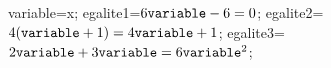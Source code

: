 \documentclass[exercice]{thedocument}%
\begin{document}
%
    \>variable=x;%
    \>egalite1={$6\<variable;-6=0$};%
    \>egalite2={$4(\<variable;+1)=4\<variable;+1$};%
    \>egalite3={$2\<variable;+3\<variable;=6\<variable;^2$};%
\end{document}
